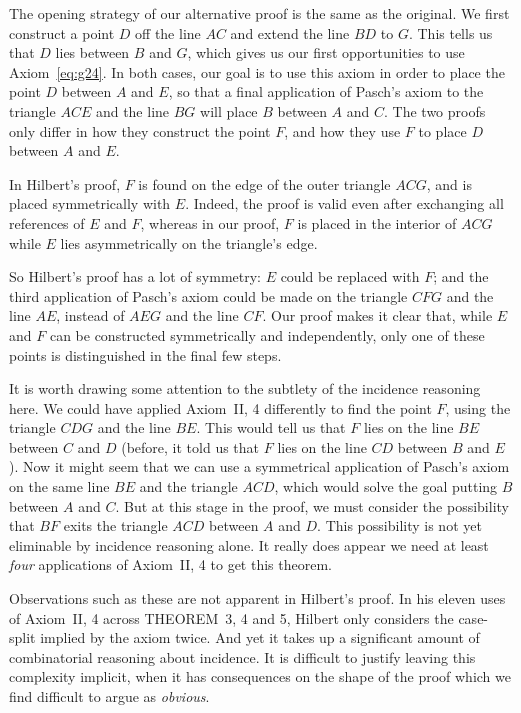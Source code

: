 The opening strategy of our alternative proof is the same as the original. We first construct a point $D$ off the line $AC$ and extend the line $BD$ to $G$. This tells us that $D$ lies between $B$ and $G$, which gives us our first opportunities to use Axiom~\ref{eq:g24}. In both cases, our goal is to use this axiom in order to place the point $D$ between $A$ and $E$, so that a final application of Pasch's axiom to the triangle $ACE$ and the line $BG$ will place $B$ between $A$ and $C$. The two proofs only differ in how they construct the point $F$, and how they use $F$ to place $D$ between $A$ and $E$.

In Hilbert's proof, $F$ is found on the edge of the outer triangle $ACG$, and is placed symmetrically with $E$. Indeed, the proof is valid even after exchanging all references of $E$ and $F$, whereas in our proof, $F$ is placed in the interior of $ACG$ while $E$ lies asymmetrically on the triangle's edge. 

So Hilbert's proof has a lot of symmetry: $E$ could be replaced with $F$; and the third application of Pasch's axiom could be made on the triangle $CFG$ and the line $AE$, instead of $AEG$ and the line $CF$. Our proof makes it clear that, while $E$ and $F$ can be constructed symmetrically and independently, only one of these points is distinguished in the final few steps. 

It is worth drawing some attention to the subtlety of the incidence reasoning here. We could have applied Axiom~II, 4 differently to find the point $F$, using the triangle $CDG$ and the line $BE$. This would tell us that $F$ lies on the line $BE$ between $C$ and $D$ (before, it told us that $F$ lies on the line $CD$ between $B$ and $E$). Now it might seem that we can use a symmetrical application of Pasch's axiom on the same line $BE$ and the triangle $ACD$, which would solve the goal putting $B$ between $A$ and $C$. But at this stage in the proof, we must consider the possibility that $BF$ exits the triangle $ACD$ between $A$ and $D$. This possibility is not yet eliminable by incidence reasoning alone. It really does appear we need at least \emph{four} applications of Axiom~II, 4 to get this theorem.

Observations such as these are not apparent in Hilbert's proof. In his eleven uses of Axiom~II, 4 across THEOREM~3, 4 and 5, Hilbert only considers the case-split implied by the axiom twice. And yet it takes up a significant amount of combinatorial reasoning about incidence. It is difficult to justify leaving this complexity implicit, when it has consequences on the shape of the proof which we find difficult to argue as \emph{obvious}. 

